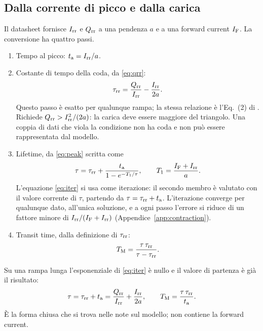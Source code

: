 \documentclass[10pt,a4paper]{scrartcl}
\let\newcommand\lmitdefine
\newcommand{\IF}{I_\mathrm{F}}
\newcommand{\Irr}{I_\mathrm{rr}}
\newcommand{\Qrr}{Q_\mathrm{rr}}
\newcommand{\ta}{t_\mathrm{a}}
\newcommand{\taurr}{\tau_\mathrm{rr}}
\newcommand{\TM}{T_\mathrm{M}}
\newcommand{\Tone}{T_1}
\begin{document}
\subsection{Dalla corrente di picco e dalla carica}
\label{sec:invpq}
Il datasheet fornisce $\Irr$ e $\Qrr$ a una pendenza $a$ e a una forward current $\IF$. La conversione ha quattro passi.
\begin{enumerate}
\item Tempo al picco: $\ta = \Irr/a$.
\item Costante di tempo della coda, da \eqref{eq:qrr}:
\begin{equation}
\taurr = \frac{\Qrr}{\Irr} - \frac{\Irr}{2a} .
\label{eq:taurr}
\end{equation}
Questo passo è esatto per qualunque rampa; la stessa relazione è l'Eq.~(2) di \cite{an6481}. Richiede $\Qrr > \Irr^2/(2a)$: la carica deve essere maggiore del triangolo. Una coppia di dati che viola la condizione non ha coda e non può essere rappresentata dal modello.
\item Lifetime, da \eqref{eq:peak} scritta come
\begin{equation}
\tau = \taurr + \frac{\ta}{1 - e^{-\Tone/\tau}} , \qquad \Tone = \frac{\IF+\Irr}{a} .
\label{eq:iter}
\end{equation}
L'equazione \eqref{eq:iter} si usa come iterazione: il secondo membro è valutato con il valore corrente di $\tau$, partendo da $\tau = \taurr + \ta$. L'iterazione converge per qualunque dato, all'unica soluzione, e a ogni passo l'errore si riduce di un fattore minore di $\Irr/(\IF+\Irr)$ (Appendice~\ref{app:contraction}).
\item Transit time, dalla definizione di $\taurr$:
\begin{equation}
\TM = \frac{\tau\,\taurr}{\tau - \taurr} .
\label{eq:tm}
\end{equation}
\end{enumerate}
Su una rampa lunga l'esponenziale di \eqref{eq:iter} è nullo e il valore di partenza è già il risultato:
\begin{equation}
\tau = \taurr + \ta = \frac{\Qrr}{\Irr} + \frac{\Irr}{2a} , \qquad \TM = \frac{\tau\,\taurr}{\ta} .
\label{eq:longinv}
\end{equation}
È la forma chiusa che si trova nelle note sul modello; non contiene la forward current.
\end{document}

